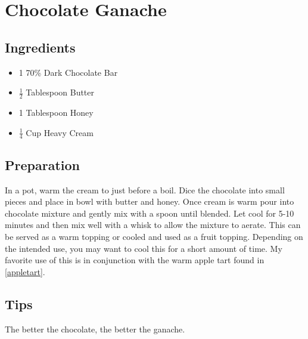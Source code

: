 \thispagestyle{fancy}
\section{Chocolate Ganache} \label{ganache}
\AddToShipoutPicture*{\Strawberries}

\subsection*{Ingredients}
\begin{multicols}{3}
	\begin{itemize}
		\item 1 70\% Dark Chocolate Bar
		\item $\frac{1}{2}$ Tablespoon Butter
		\item 1 Tablespoon Honey
		\item $\frac{1}{4}$ Cup Heavy Cream
	\end{itemize}
\end{multicols}

\subsection*{Preparation}

In a pot, warm the cream to just before a boil. Dice the chocolate into small pieces and place in bowl with butter and honey. Once cream is warm pour into chocolate mixture and gently mix with a spoon until blended. Let cool for 5-10 minutes and then mix well with a whisk to allow the mixture to aerate. This can be served as a warm topping or cooled and used as a fruit topping. Depending on the intended use, you may want to cool this for a short amount of time. My favorite use of this is in conjunction with the warm apple tart found in \ref{appletart}.

\subsection*{Tips}

The better the chocolate, the better the ganache.
